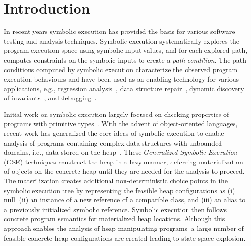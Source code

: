 \section{Introduction}

In recent years symbolic execution has provided the basis for various 
software testing and analysis techniques. Symbolic execution
systematically explores the program execution space using
symbolic input values, and for each explored path, computes
constraints on the symbolic inputs to create a \emph{ path condition}.
The path conditions computed by
symbolic execution characterize the observed program execution
behaviours and have been used as an enabling technology for various
applications, e.g., regression
analysis~\cite{backes:2012,Godefroid:SAS11,Person:FSE08,person:pldi2011,Ramos:2011,Yang:ISSTA12},
data structure repair~\cite{KhurshidETAL05RepairingStructurally},
dynamic discovery of
invariants~\cite{CsallnerETAL08DySy,Zhang:ISSTA14}, and
debugging~\cite{Ma:2011}.

Initial work on symbolic execution largely focused on checking 
properties of programs with primitive types~\cite{clarke76TSE,King:76}.
With the advent of object-oriented languages,
recent work has generalized the core ideas of symbolic execution to enable 
analysis of programs containing complex data structures with unbounded 
domains, i.e., data stored on the heap~\cite{Kiasan06,Kiasan07,GSE03}.  
These \emph{Generalized Symbolic Execution} (GSE) techniques construct the 
heap in a lazy manner, deferring
materialization of objects on the concrete heap until they are needed
for the analysis to proceed. The materilization 
creates additional non-deterministic choice points in the symbolic
execution tree by representing the feasible heap configurations as (i)
null, (ii) an instance of a new reference of a compatible class, and (iii)
an alias to a previously initialized symbolic reference.  Symbolic
execution then follows concrete program semantics for materialized heap
locations. Although this approach enables the analysis of heap
manipulating programs, a large number of feasible concrete heap
configurations are created leading to state space explosion.

